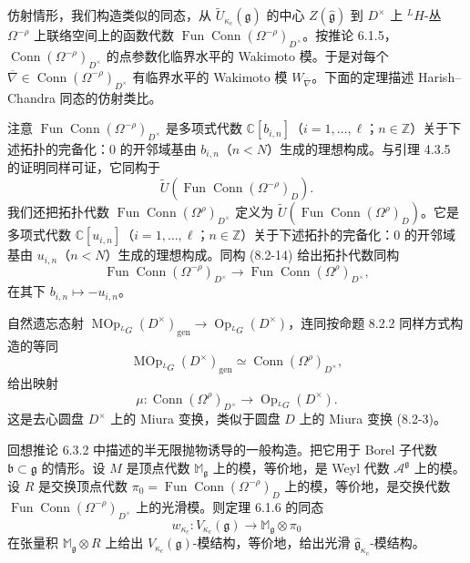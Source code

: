仿射情形，我们构造类似的同态，从 $\widetilde U_{\kappa_c}(\hat{\mathfrak g})$ 的中心 $Z(\hat{\mathfrak g})$ 到 $D^\times$ 上 ${}^LH$-丛 $\Omega^{-\rho}$ 上联络空间上的函数代数 $\operatorname{Fun}\operatorname{Conn}(\Omega^{-\rho})_{D^\times}$。按推论 6.1.5，$\operatorname{Conn}(\Omega^{-\rho})_{D^\times}$ 的点参数化临界水平的 Wakimoto 模。于是对每个 $\overline\nabla\in\operatorname{Conn}(\Omega^{-\rho})_{D^\times}$ 有临界水平的 Wakimoto 模 $W_{\overline\nabla}$。下面的定理描述 Harish--Chandra 同态的仿射类比。

注意 $\operatorname{Fun}\operatorname{Conn}(\Omega^{-\rho})_{D^\times}$ 是多项式代数 $\mathbb C[b_{i,n}]$（$i=1,\dots,\ell$；$n\in\mathbb Z$）关于下述拓扑的完备化：$0$ 的开邻域基由 $b_{i,n}$（$n<N$）生成的理想构成。与引理 4.3.5 的证明同样可证，它同构于
\[
    \widetilde U(\operatorname{Fun}\operatorname{Conn}(\Omega^{-\rho})_D).
\]
我们还把拓扑代数 $\operatorname{Fun}\operatorname{Conn}(\Omega^{\rho})_{D^\times}$ 定义为 $\widetilde U(\operatorname{Fun}\operatorname{Conn}(\Omega^{\rho})_D)$。它是多项式代数 $\mathbb C[u_{i,n}]$（$i=1,\dots,\ell$；$n\in\mathbb Z$）关于下述拓扑的完备化：$0$ 的开邻域基由 $u_{i,n}$（$n<N$）生成的理想构成。同构 (8.2-14) 给出拓扑代数同构
\[
    \operatorname{Fun}\operatorname{Conn}(\Omega^{-\rho})_{D^\times}\longrightarrow\operatorname{Fun}\operatorname{Conn}(\Omega^{\rho})_{D^\times},
\]
在其下 $b_{i,n}\mapsto-u_{i,n}$。

自然遗忘态射 $\operatorname{MOp}_{{}^LG}(D^\times)_{\mathrm{gen}}\to\operatorname{Op}_{{}^LG}(D^\times)$，连同按命题 8.2.2 同样方式构造的等同
\[
    \operatorname{MOp}_{{}^LG}(D^\times)_{\mathrm{gen}}\simeq\operatorname{Conn}(\Omega^{\rho})_{D^\times},
\]
给出映射
\begin{equation}
    \mu:\operatorname{Conn}(\Omega^{\rho})_{D^\times}\longrightarrow\operatorname{Op}_{{}^LG}(D^\times).
    \tag{8.3-3}
\end{equation}
这是去心圆盘 $D^\times$ 上的 Miura 变换，类似于圆盘 $D$ 上的 Miura 变换 (8.2-3)。

回想推论 6.3.2 中描述的半无限抛物诱导的一般构造。把它用于 Borel 子代数 $\mathfrak b\subset\mathfrak g$ 的情形。设 $M$ 是顶点代数 $\mathbb M_{\mathfrak g}$ 上的模，等价地，是 Weyl 代数 $\mathcal A^{\mathfrak g}$ 上的模。设 $R$ 是交换顶点代数 $\pi_0=\operatorname{Fun}\operatorname{Conn}(\Omega^{-\rho})_D$ 上的模，等价地，是交换代数 $\operatorname{Fun}\operatorname{Conn}(\Omega^{-\rho})_{D^\times}$ 上的光滑模。则定理 6.1.6 的同态
\[
    w_{\kappa_c}:V_{\kappa_c}(\mathfrak g)\longrightarrow\mathbb M_{\mathfrak g}\otimes\pi_0
\]
在张量积 $\mathbb M_{\mathfrak g}\otimes R$ 上给出 $V_{\kappa_c}(\mathfrak g)$-模结构，等价地，给出光滑 $\hat{\mathfrak g}_{\kappa_c}$-模结构。

